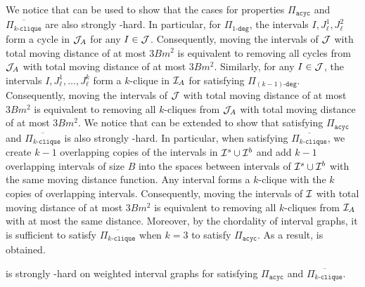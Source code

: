 We notice that  can be used to show that the cases for properties $\Pi_{\texttt{acyc}}$ and $\overline{\Pi_{k\texttt{-clique}}}$ are also strongly \NP-hard.
In particular, for $\Pi_{1\texttt{-deg}}$, the intervals $I,J^1_\ell,J^2_\ell$ form a cycle in $\mathcal{J}_A$ for any $I \in \mathcal{J}$. Consequently, moving the intervals of $\mathcal{J}$ with total moving distance of at most $3Bm^2$ is equivalent to removing all cycles from $\mathcal{J}_A$ with total moving distance of at most $3Bm^2$.
Similarly, for any $I\in \mathcal{J}$, the intervals $I,J^1_\ell,\ldots,J^k_\ell$ form a $k$-clique in $\mathcal{I}_A$ for satisfying $\Pi_{(k-1)\texttt{-deg}}$. Consequently, moving the intervals of $\mathcal{J}$ with total moving distance of at most $3Bm^2$ is equivalent to removing all $k$-cliques from $\mathcal{J}_A$ with total moving distance of at most $3Bm^2$.
\fi
\ifConf
We notice that  can be extended to show that satisfying $\Pi_{\texttt{acyc}}$ and $\overline{\Pi_{k\texttt{-clique}}}$ is also strongly \NP-hard.
In particular, when satisfying $\overline{\Pi_{k\texttt{-clique}}}$, we create $k-1$ overlapping copies of the intervals in $\mathcal{I}^s\cup\mathcal{I}^b$ and add $k-1$ overlapping intervals of size $B$ into the spaces between intervals of $\mathcal{I}^s\cup\mathcal{I}^b$ with the same moving distance function.
Any interval forms a $k$-clique with the $k$ copies of overlapping intervals.
Consequently, moving the intervals of $\mathcal{I}$ with total moving distance of at most $3Bm^2$ is equivalent to removing all $k$-cliques from $\mathcal{I}_A$ with at most the same distance.
Moreover, by the chordality of interval graphs, it is sufficient to satisfy $\overline{\Pi_{k\texttt{-clique}}}$ when $k =3$ to satisfy $\Pi_{\texttt{acyc}}$.
\fi
As a result,  is obtained.

\begin{corollary}\label{cor:ig_nphard_acyc_and_nokclique}
    {\gged} is strongly \NP-hard on weighted interval graphs for satisfying $\Pi_{\texttt{acyc}}$ and $\overline{\Pi_{k\texttt{-clique}}}$.
\end{corollary}
